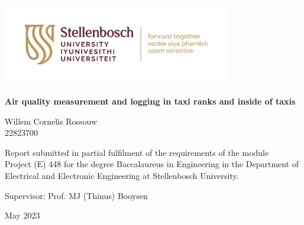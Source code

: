 \graphicspath{{frontmatter/fig/}}

\begin{titlepage}
	\begin{center}
		
		\includegraphics[width=10cm]{US-logo-top}
		
		\vfill
		
		{\rmfamily  \bfseries \huge Air quality measurement and logging in taxi ranks and inside of taxis \par}
		
		\vfill
		
		{\large {\Large Willem Cornelis Rossouw} \\ 22823700 \par}
		
		\vfill
		
		\vfill
		
		{Report submitted in partial fulfilment of the requirements of the module \\
			Project (E) 448 for the degree Baccalaureus in Engineering in the Department of
			Electrical and Electronic Engineering at Stellenbosch University. \par}
		
		\vfill
		
		{\large {Supervisor}: Prof. MJ (Thinus) Booysen } %
		
		\vfill
		
		{\Large May 2023}
	\end{center}
\end{titlepage}
